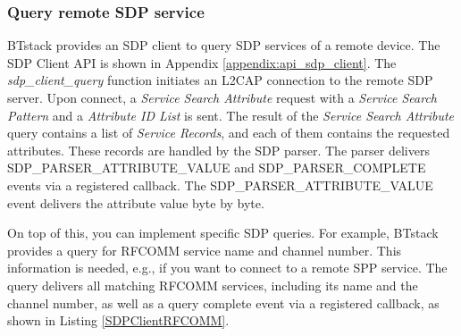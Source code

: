 \subsubsection{Query remote SDP service}
\label{subsection:querysdp}

BTstack provides an SDP client to query SDP services of a remote device. The SDP Client API  is shown in Appendix \ref{appendix:api_sdp_client}. The \emph{sdp\_client\_query} function initiates an L2CAP connection to the remote SDP server. Upon connect, a \emph{Service Search Attribute} request with a \emph{Service Search Pattern} and a \emph{Attribute ID List} is sent. The result of the \emph{Service Search Attribute} query contains a list of \emph{Service Records}, and each of them contains the requested attributes. These records are handled by the SDP parser. The parser delivers SDP\_PARSER\_ATTRIBUTE\_VALUE and SDP\_PARSER\_COMPLETE events via a registered callback. The SDP\_PARSER\_ATTRIBUTE\_VALUE event delivers the attribute value byte by byte.

On top of this, you can implement specific SDP queries. For example, BTstack provides a query for RFCOMM service name and channel number. This information is needed, e.g., if you want to connect to a remote SPP service. The query delivers all matching RFCOMM services, including its name and the channel number, as well as a query complete  event via a registered callback, as shown in Listing \ref{SDPClientRFCOMM}.

